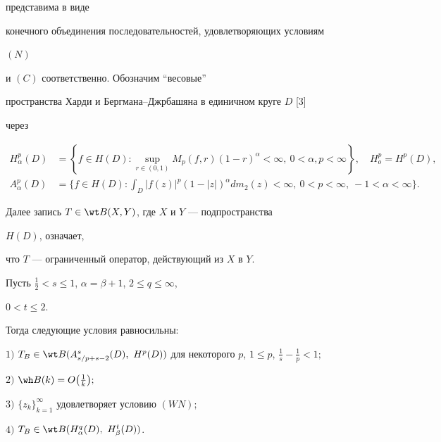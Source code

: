 представима в виде 


конечного объединения последовательностей, удовлетворяющих условиям 


$(N)$ 


и $(C)$ соответственно. Обозначим ``весовые'' 


пространства Харди и Бергмана--Джрбашяна в единичном круге $D$ [3] 


через 


\begin{align*} 


H^p_\alpha(D)&=\left\{f\in H(D):\sup_{r\in(0,1)} 


M_p(f,r)(1-r)^\alpha<\infty,\ 0<\alpha,p<\infty\right\},\quad 


H^p_o=H^p(D), \\ 


% 


A^p_\alpha(D)&=\bigg\{f\in H(D):\int_D |f(z)|^p(1-|z|)^\alpha 


d m_2(z)<\infty,\ 0<p<\infty,\ -1<\alpha<\infty\bigg\}. 


\end{align*} 


 


Далее запись $T\in\wt B(X,Y)$, где $X$ и $Y$ --- подпространства 


$H(D)$, означает, 


что $T$ --- ограниченный оператор, действующий из $X$ в $Y$. 


 


\begin{thm} 


Пусть $\frac{1}{2}<s\le1$, $\alpha=\beta+1$, $2\le q\le\infty$, 


$0<t\le2$. 


Тогда следующие условия равносильны\/${:}$ 


 


$1)$ $T_B\in \wt B(A^s_{s/p+s-2}(D),\ H^p(D))$ для некоторого $p$, $1\le 


p$, $\frac{1}{s}-\frac{1}{p}<1;$ 


 


$2)$ $\wh B(k)=O\big(\frac{1}{k}\big);$ 


 


$3)$ $\{z_k\}^\infty_{k=1}$ удовлетворяет условию $(W N);$ 


 


$4)$ $T_B\in\wt B(H^q_\alpha(D),\ H^t_\beta(D))$. 


\end{thm} 



